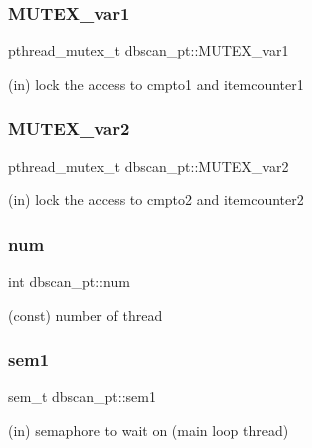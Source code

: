 \subsubsection{\texorpdfstring{M\+U\+T\+E\+X\+\_\+var1}{MUTEX\_var1}}
{\footnotesize\ttfamily pthread\+\_\+mutex\+\_\+t dbscan\+\_\+pt\+::\+M\+U\+T\+E\+X\+\_\+var1}



(in) lock the access to cmpto1 and itemcounter1 

\mbox{\label{structdbscan__pt_ad60703d4e4e49b5676c314ffacdd3cc6}} 
\subsubsection{\texorpdfstring{M\+U\+T\+E\+X\+\_\+var2}{MUTEX\_var2}}
{\footnotesize\ttfamily pthread\+\_\+mutex\+\_\+t dbscan\+\_\+pt\+::\+M\+U\+T\+E\+X\+\_\+var2}



(in) lock the access to cmpto2 and itemcounter2 

\mbox{\label{structdbscan__pt_aaa1b99005b0207af9c85a6fc73368eb3}} 
\subsubsection{\texorpdfstring{num}{num}}
{\footnotesize\ttfamily int dbscan\+\_\+pt\+::num}



(const) number of thread 

\mbox{\label{structdbscan__pt_a716ce695e04d99f1e045fb9de1fb70f0}} 
\subsubsection{\texorpdfstring{sem1}{sem1}}
{\footnotesize\ttfamily sem\+\_\+t dbscan\+\_\+pt\+::sem1}



(in) semaphore to wait on (main loop thread) 

